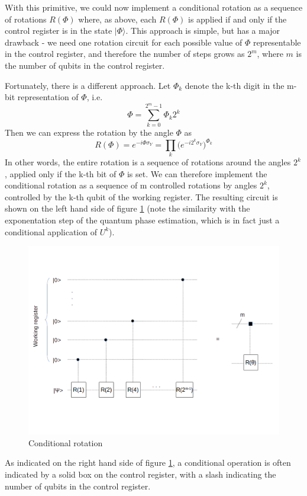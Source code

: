 \documentclass[a4paper, draft]{article}
\theoremstyle{own}
\theoremstyle{remark}
\begin{document}
With this primitive, we could now implement a conditional rotation as a sequence of rotations $R(\Phi)$ where, as above, each $R(\Phi)$ is applied if and only if the control register is in the state $|\Phi \rangle$. This approach is simple, but has a major drawback - we need one rotation circuit for each possible value of $\Phi$ representable in the control register, and therefore the number of steps grows as $2^m$, where $m$ is the number of qubits in the control register. 

Fortunately, there is a different approach. Let $\Phi_k$ denote the k-th digit in the m-bit representation of $\Phi$, i.e.
$$
\Phi = \sum_{k=0}^{2^m-1} \Phi_k 2^k
$$
Then we can express the rotation by the angle $\Phi$ as
$$
R(\Phi) = e^{-i \Phi \sigma_Y} = \prod_k \big( e^{-i 2^k \sigma_Y} \big)^{\Phi_k}
$$
In other words, the entire rotation is a sequence of rotations around the angles $2^k$, applied only if the k-th bit of $\Phi$ is set. We can therefore implement the conditional rotation as a sequence of m controlled rotations by angles $2^k$, controlled by the k-th qubit of the working register. The resulting circuit is shown on the left hand side of figure \ref{fig:ConditionalRotation} (note the similarity with the exponentation step of the quantum phase estimation, which is in fact just a conditional application of $U^k$).

\begin{figure}[ht]
\centering
\includegraphics[width=0.7\linewidth]{images/ConditionalRotation}
\caption[Conditional rotation]{Conditional rotation}
\label{fig:ConditionalRotation}
\end{figure}

As indicated on the right hand side of figure \ref{fig:ConditionalRotation}, a conditional operation is often indicated by a solid box on the control register, with a slash indicating the number of qubits in the control register. 
\end{document}
